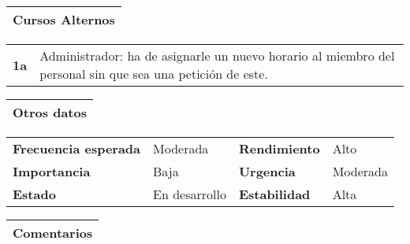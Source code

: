 \documentclass[11pt,a4paper]{article}
\begin{document}
\begin{table}[H]
	\begin{tabularx}{\textwidth}{X}
		\textbf{Cursos Alternos}\\ \hline
	\end{tabularx}
	
	\begin{tabularx}{\textwidth}{cX}
		\textbf{1a} & Administrador: ha de asignarle un nuevo horario al miembro del personal sin que sea una petición de este.
	\end{tabularx}
\end{table}

\begin{table}[H]
	\begin{tabularx}{\textwidth}{X}
		\textbf{Otros datos}\\ \hline
	\end{tabularx}
	
	\begin{tabularx}{\textwidth}{lXlX}
		\textbf{Frecuencia esperada} & Moderada & \textbf{Rendimiento} & Alto\\
		\textbf{Importancia} & Baja & \textbf{Urgencia} & Moderada \\
		\textbf{Estado} & En desarrollo & \textbf{Estabilidad} & Alta\\
	\end{tabularx}
	
	\begin{tabularx}{\textwidth}{X}
		\textbf{Comentarios}\\ \hline
	\end{tabularx}
	
\end{table}

\newpage


\end{document}
